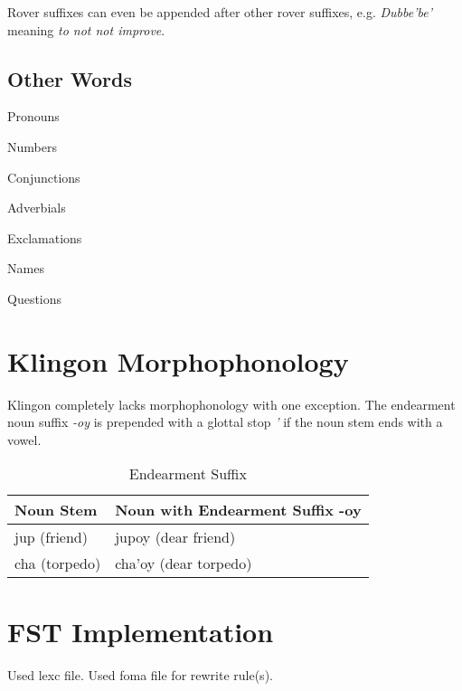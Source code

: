 \documentclass[11pt]{article}
\begin{document}
Rover suffixes can even be appended after other rover suffixes, e.g. \textit{Dubbe'be'} meaning \textit{to not not improve}.

\subsection {Other Words}

Pronouns

Numbers

Conjunctions

Adverbials

Exclamations

Names

Questions

\section{Klingon Morphophonology}

Klingon completely lacks morphophonology with one exception. The endearment noun suffix \textit{-oy} is prepended with a glottal stop \textit{'} if the noun stem ends with a vowel.

\begin{table}[h]
\begin{center}
\begin{tabular}{|l|l|}
\hline \bf Noun Stem & \bf Noun with Endearment Suffix -oy \\ \hline
jup (friend) & jupoy (dear friend) \\
cha (torpedo) & cha'oy (dear torpedo) \\
\hline
\end{tabular}
\end{center}
\caption{Endearment Suffix }
\end{table}

\section{FST Implementation}

Used lexc file.
Used foma file for rewrite rule(s).

%
%
\end{document}

